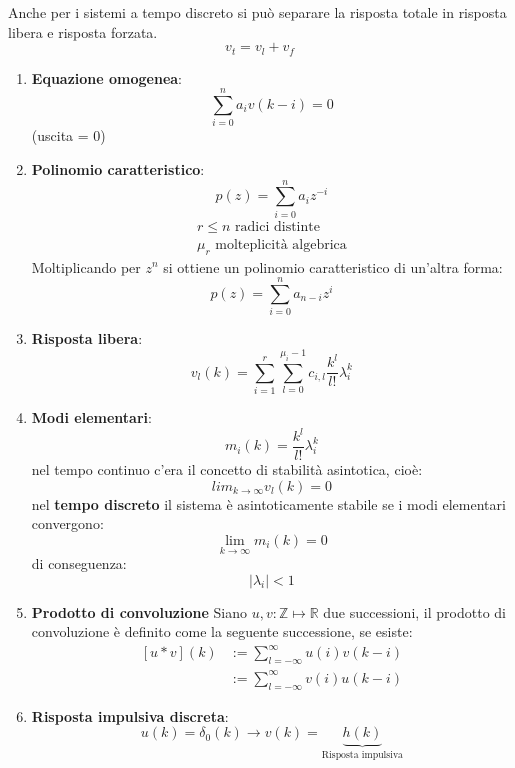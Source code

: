 \documentclass[a4paper]{article}
\begin{document}
Anche per i sistemi a tempo discreto si può separare la risposta totale in risposta
libera e risposta forzata.
\[
v_t = v_l + v_f
\] 
\begin{enumerate}
  \item \textbf{Equazione omogenea}:
    \[
      \sum_{i=0}^{n} a_i v(k-i) = 0
    \] 
    (uscita = 0)

  \item \textbf{Polinomio caratteristico}:
    \[
      p(z) = \sum_{i=0}^{n} a_i z^{-i}
    \] 
    \[
    \begin{aligned}
      r \le n \text{ radici distinte}\\
      \mu_r \text{ molteplicità algebrica}
    \end{aligned}
    \] 
    Moltiplicando per \( z^n \) si ottiene un polinomio caratteristico di un'altra forma:
    \[
      p(z) = \sum_{i=0}^{n} a_{n-i} z^{i}
    \] 

  \item \textbf{Risposta libera}:
    \[
      v_l(k) = \sum_{i=1}^{r} \sum_{l=0}^{\mu_i - 1} c_{i,l} \frac{k^l}{l!} \lambda_i^k
    \] 

  \item \textbf{Modi elementari}:
    \[
      m_i(k) = \frac{k^l}{l!} \lambda_i^k
    \] 
    nel tempo continuo c'era il concetto di stabilità asintotica, cioè:
    \[
      lim_{k \to \infty} v_l(k) = 0
    \] 
    nel \textbf{tempo discreto} il sistema è asintoticamente stabile se i modi elementari
    convergono:
    \[
      \lim_{k \to \infty} m_i(k) = 0
    \] 
    di conseguenza:
    \[
      |\lambda_i| < 1
    \] 

  \item \textbf{Prodotto di convoluzione}
    Siano \( u,v: \mathbb{Z} \mapsto \mathbb{R} \) due successioni, il prodotto di convoluzione
    è definito come la seguente successione, se esiste:
    \[
      \begin{aligned}
        [u \ast v](k) &:= \sum_{l = -\infty}^{\infty} u(i) v(k-i)\\
                      &:= \sum_{l = -\infty}^{\infty} v(i) u(k-i)
      \end{aligned}
    \] 
    
  \item \textbf{Risposta impulsiva discreta}:
    \[
      u(k) = \delta_0(k) \to v(k) = \underbrace{h(k)}_{\text{Risposta impulsiva}}
    \] 


\end{enumerate}
\end{document}
